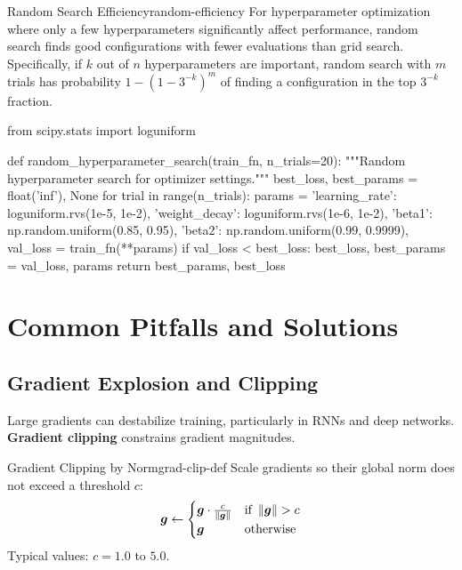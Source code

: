 \documentclass[../../main.tex]{subfiles}
\begin{document}
\begin{theorem}{Random Search Efficiency}{random-efficiency}
For hyperparameter optimization where only a few hyperparameters significantly affect performance, random search finds good configurations with fewer evaluations than grid search. Specifically, if $k$ out of $n$ hyperparameters are important, random search with $m$ trials has probability $1 - (1 - 3^{-k})^m$ of finding a configuration in the top $3^{-k}$ fraction.
\end{theorem}

\begin{pythoncode}
from scipy.stats import loguniform

def random_hyperparameter_search(train_fn, n_trials=20):
    """Random hyperparameter search for optimizer settings."""
    best_loss, best_params = float('inf'), None
    for trial in range(n_trials):
        params = {
            'learning_rate': loguniform.rvs(1e-5, 1e-2),
            'weight_decay': loguniform.rvs(1e-6, 1e-2),
            'beta1': np.random.uniform(0.85, 0.95),
            'beta2': np.random.uniform(0.99, 0.9999),
        }
        val_loss = train_fn(**params)
        if val_loss < best_loss:
            best_loss, best_params = val_loss, params
    return best_params, best_loss
\end{pythoncode}

\section{Common Pitfalls and Solutions}
\label{sec:pitfalls}

\subsection{Gradient Explosion and Clipping}

Large gradients can destabilize training, particularly in RNNs and deep networks. \textbf{Gradient clipping} constrains gradient magnitudes.

\begin{definition}{Gradient Clipping by Norm}{grad-clip-def}
Scale gradients so their global norm does not exceed a threshold $c$:
\[
    \boldsymbol{g} \gets \begin{cases}
        \boldsymbol{g} \cdot \frac{c}{\left\lVert \boldsymbol{g} \right\rVert} & \text{if } \left\lVert \boldsymbol{g} \right\rVert > c \\
        \boldsymbol{g} & \text{otherwise}
    \end{cases}
\]
Typical values: $c = 1.0$ to $5.0$.
\end{definition}
\end{document}
